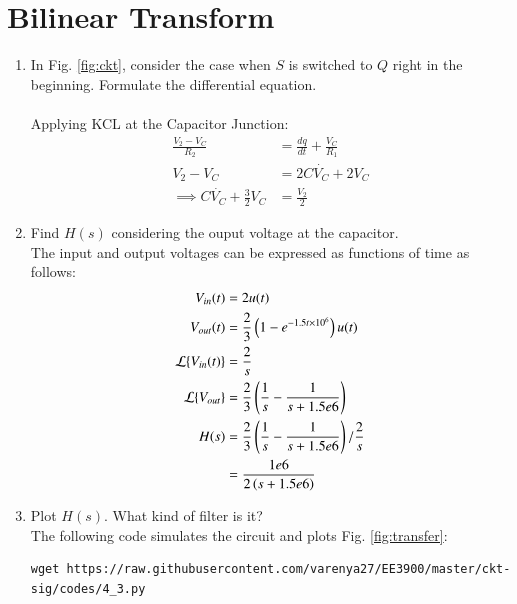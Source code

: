 \documentclass[journal,12pt,twocolumn]{IEEEtran}
\renewcommand\thesection{\arabic{section}}
\begin{document}
	\section{Bilinear Transform}
	\begin{enumerate}[label=\arabic*.,ref=\thesection.\theenumi]
	\item In Fig. 
				\ref{fig:ckt},
				consider the case when $S$ is switched to $Q$ right in the beginning. Formulate the differential equation.\\
				\solution \\ Applying KCL at the Capacitor Junction:
            \begin{align}
                \frac{V_2-V_C}{R_2} &= \frac{dq}{dt}+\frac{V_C}{R_1}\\
                V_2-V_C &= 2C\dot{V_C}+2V_C\\
                \implies C\dot{V_C}+\frac{3}{2}V_C&= \frac{V_2}{2} \label{eq:vct-de}
            \end{align}
	\item  Find $H(s)$ considering the ouput voltage at the capacitor.\\\solution
	The input and output voltages can be expressed as functions of time as follows:
			\begin{align}
				V_{in}(t) &= 2u(t)\\
				V_{out}(t) &= \frac{2}{3}\left(1-e^{-1.5t\times10^6}\right)u(t)\\
				\mathcal{L}\{V_{in}(t)\} &= \frac{2}{s}\\
				\mathcal{L}\{V_{out}\} &= \frac{2}{3}\left(\frac{1}{s} - \frac{1}{s+1.5e6}\right)\\
				H(s) &= \frac{2}{3}\left(\frac{1}{s}-\frac{1}{s+1.5e6}\right)/\frac{2}{s}\\
				&= \frac{1e6}{2\left(s+1.5e6\right)} \label{eq:hs}
			\end{align}
	\item Plot $H(s)$.  What kind of filter is it?\\
		\solution The following code simulates the circuit and plots Fig. \ref{fig:transfer}:
\begin{lstlisting}
wget https://raw.githubusercontent.com/varenya27/EE3900/master/ckt-sig/codes/4_3.py
\end{lstlisting}
	\begin{figure}[h!]
	    \centering

\end{figure}
\end{enumerate}
\end{document}
